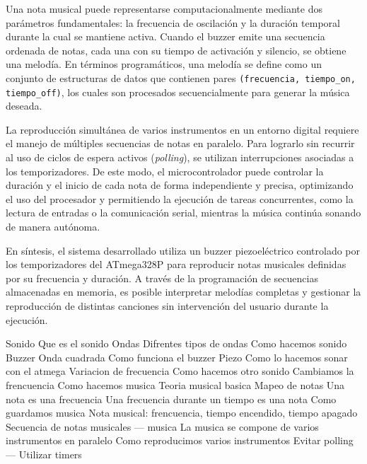 \vspace{1em}

Una nota musical puede representarse computacionalmente mediante dos parámetros fundamentales: la frecuencia de oscilación y la duración temporal durante la cual se mantiene activa. Cuando el buzzer emite una secuencia ordenada de notas, cada una con su tiempo de activación y silencio, se obtiene una melodía. En términos programáticos, una melodía se define como un conjunto de estructuras de datos que contienen pares \texttt{(frecuencia, tiempo\_on, tiempo\_off)}, los cuales son procesados secuencialmente para generar la música deseada.

\vspace{1em}

La reproducción simultánea de varios instrumentos en un entorno digital requiere el manejo de múltiples secuencias de notas en paralelo. Para lograrlo sin recurrir al uso de ciclos de espera activos (\textit{polling}), se utilizan interrupciones asociadas a los temporizadores. De este modo, el microcontrolador puede controlar la duración y el inicio de cada nota de forma independiente y precisa, optimizando el uso del procesador y permitiendo la ejecución de tareas concurrentes, como la lectura de entradas o la comunicación serial, mientras la música continúa sonando de manera autónoma.

\vspace{1em}

En síntesis, el sistema desarrollado utiliza un buzzer piezoeléctrico controlado por los temporizadores del ATmega328P para reproducir notas musicales definidas por su frecuencia y duración. A través de la programación de secuencias almacenadas en memoria, es posible interpretar melodías completas y gestionar la reproducción de distintas canciones sin intervención del usuario durante la ejecución.


\vspace{1em}


Sonido
Que es el sonido
Ondas
Difrentes tipos de ondas
Como hacemos sonido
Buzzer
Onda cuadrada
Como funciona el buzzer
Piezo
Como lo hacemos sonar con el atmega
Variacion de frecuencia
Como hacemos otro sonido
Cambiamos la frencuencia
Como hacemos musica
Teoria musical basica
Mapeo de notas
Una nota es una frecuencia
Una frecuencia durante un tiempo es una nota
Como guardamos musica
Nota musical: frencuencia, tiempo encendido, tiempo apagado
Secuencia de notas musicales --- musica
La musica se compone de varios instrumentos en paralelo
Como reproducimos varios instrumentos
Evitar polling --- Utilizar timers

